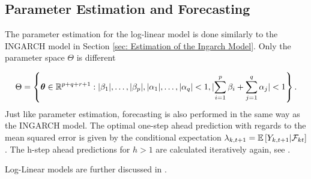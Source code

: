 \subsection{Parameter Estimation and Forecasting}
\label{sec: Log-Linear Parameter Estimation and Forecasting}

The parameter estimation for the log-linear model is done similarly to the INGARCH model in Section \ref{sec: Estimation of the Ingarch Model}. Only the parameter space $\Theta$ is different

\begin{equation}
\Theta = \left\{ \bm{\theta} \in \mathbb{R}^{p+q+r+1}: \lvert\beta_1\rvert,\ldots,\lvert\beta_p\rvert,\lvert\alpha_1\rvert,\ldots,\lvert\alpha_q\rvert < 1, \lvert\sum_{i=1}^p\beta_i + \sum_{j=1}^q\alpha_j \rvert < 1 \right\}.
\label{eq:Parameter Space log-linear}
\end{equation}
%
Just like parameter estimation, forecasting is also performed in the same way as the INGARCH model. The optimal one-step ahead prediction with regards to the mean squared error is given by the conditional expectation $\lambda_{k,t+1}=\mathbb{E}\left[Y_{k,t+1} | \mathcal{F}_{kt} \right]$. The h-step ahead predictions for $h>1$ are calculated iteratively again, see \textcite{Liboschik:2016}. 

Log-Linear models are further discussed in \textcite{Fokianos:2011,Woodard:2011,Douc:2013}.


%
%
%
%
%

